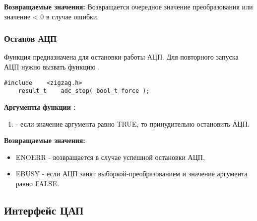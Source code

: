 {\bfseries Возвращаемые значения:}
Возвращается очередное значение преобразования или значение < 0 в
случае ошибки.

\subsubsection{Останов АЦП}
Функция  предназначена для остановки работы АЦП. Для повторного
запуска АЦП нужно вызвать функцию .

\begin{lstlisting}[caption=\myarg{adc\_stop()} - останов АЦП, label=adcstopfunc ]
    #include    <zigzag.h>
    result_t    adc_stop( bool_t force );
\end{lstlisting}

{\bfseries Аргументы функции :}
{\itshape
\begin{enumerate}
\item {} - если значение аргумента равно TRUE, то принудительно
остановить АЦП.
\end{enumerate}
}

{\bfseries Возвращаемые значения:}
{\itshape
\begin{itemize}
\item ENOERR - возвращается в случае успешной остановки АЦП,
\item EBUSY - если АЦП занят выборкой-преобразованием и значение аргумента 
 равно FALSE.
\end{itemize}
}

\subsection{Интерфейс ЦАП}


